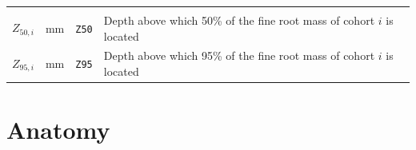 \documentclass[]{book}
\begin{document}
\begin{longtable}[]{@{}llll@{}}
\begin{minipage}[t]{0.45\columnwidth}
\end{minipage}\tabularnewline
\begin{minipage}[t]{0.11\columnwidth}\raggedright\strut
\(Z_{50,i}\)\strut
\end{minipage} & \begin{minipage}[t]{0.10\columnwidth}\raggedright\strut
mm\strut
\end{minipage} & \begin{minipage}[t]{0.12\columnwidth}\raggedright\strut
\texttt{Z50}\strut
\end{minipage} & \begin{minipage}[t]{0.45\columnwidth}\raggedright\strut
Depth above which 50\% of the fine root mass of cohort \(i\) is
located\strut
\end{minipage}\tabularnewline
\begin{minipage}[t]{0.11\columnwidth}\raggedright\strut
\(Z_{95,i}\)\strut
\end{minipage} & \begin{minipage}[t]{0.10\columnwidth}\raggedright\strut
mm\strut
\end{minipage} & \begin{minipage}[t]{0.12\columnwidth}\raggedright\strut
\texttt{Z95}\strut
\end{minipage} & \begin{minipage}[t]{0.45\columnwidth}\raggedright\strut
Depth above which 95\% of the fine root mass of cohort \(i\) is
located\strut
\end{minipage}\tabularnewline
\bottomrule
\end{longtable}

\section{Anatomy}\label{anatomy}
\end{document}
